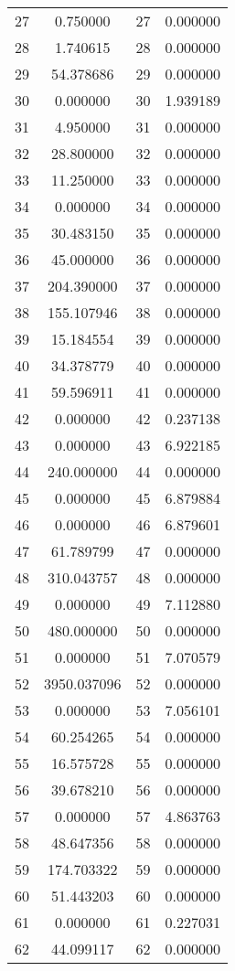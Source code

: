 \documentclass[12pt]{article}
\begin{document}
\begin{longtable}{@{}cccc@{}}
27 & 0.750000 & 27 & 0.000000 \\
28 & 1.740615 & 28 & 0.000000 \\
29 & 54.378686 & 29 & 0.000000 \\
30 & 0.000000 & 30 & 1.939189 \\
31 & 4.950000 & 31 & 0.000000 \\
32 & 28.800000 & 32 & 0.000000 \\
33 & 11.250000 & 33 & 0.000000 \\
34 & 0.000000 & 34 & 0.000000 \\
35 & 30.483150 & 35 & 0.000000 \\
36 & 45.000000 & 36 & 0.000000 \\
37 & 204.390000 & 37 & 0.000000 \\
38 & 155.107946 & 38 & 0.000000 \\
39 & 15.184554 & 39 & 0.000000 \\
40 & 34.378779 & 40 & 0.000000 \\
41 & 59.596911 & 41 & 0.000000 \\
42 & 0.000000 & 42 & 0.237138 \\
43 & 0.000000 & 43 & 6.922185 \\
44 & 240.000000 & 44 & 0.000000 \\
45 & 0.000000 & 45 & 6.879884 \\
46 & 0.000000 & 46 & 6.879601 \\
47 & 61.789799 & 47 & 0.000000 \\
48 & 310.043757 & 48 & 0.000000 \\
49 & 0.000000 & 49 & 7.112880 \\
50 & 480.000000 & 50 & 0.000000 \\
51 & 0.000000 & 51 & 7.070579 \\
52 & 3950.037096 & 52 & 0.000000 \\
53 & 0.000000 & 53 & 7.056101 \\
54 & 60.254265 & 54 & 0.000000 \\
55 & 16.575728 & 55 & 0.000000 \\
56 & 39.678210 & 56 & 0.000000 \\
57 & 0.000000 & 57 & 4.863763 \\
58 & 48.647356 & 58 & 0.000000 \\
59 & 174.703322 & 59 & 0.000000 \\
60 & 51.443203 & 60 & 0.000000 \\
61 & 0.000000 & 61 & 0.227031 \\
62 & 44.099117 & 62 & 0.000000 \\

\end{longtable}
\end{document}
